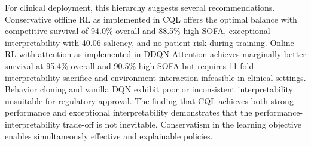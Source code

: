 For clinical deployment, this hierarchy suggests several recommendations. Conservative offline RL as implemented in CQL offers the optimal balance with competitive survival of 94.0\% overall and 88.5\% high-SOFA, exceptional interpretability with 40.06 saliency, and no patient risk during training. Online RL with attention as implemented in DDQN-Attention achieves marginally better survival at 95.4\% overall and 90.5\% high-SOFA but requires 11-fold interpretability sacrifice and environment interaction infeasible in clinical settings. Behavior cloning and vanilla DQN exhibit poor or inconsistent interpretability unsuitable for regulatory approval. The finding that CQL achieves both strong performance and exceptional interpretability demonstrates that the performance-interpretability trade-off is not inevitable. Conservatism in the learning objective enables simultaneously effective and explainable policies.

